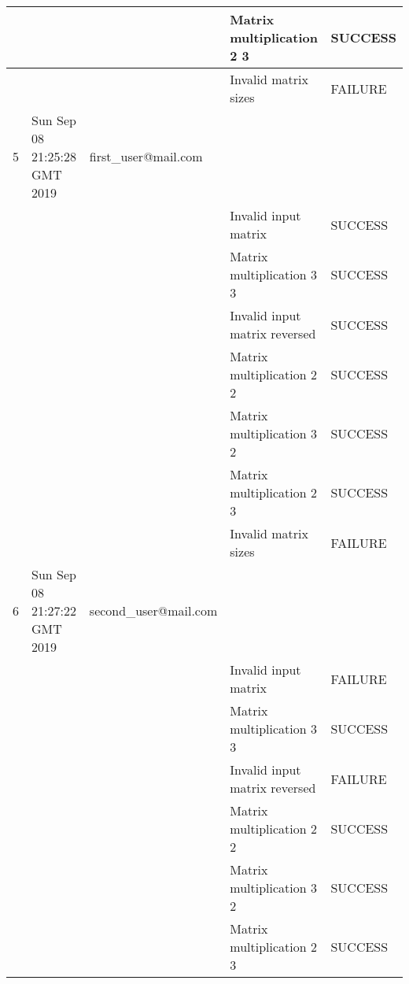 \begin{table}[H]
{\begin{tabular}{|l|l|l|l|l|}
    &                              &                                 & Matrix multiplication 2 3     & SUCCESS \\ \hline
    &                              &                                 & Invalid matrix sizes          & FAILURE \\ \hline
    5     & Sun Sep 08 21:25:28 GMT 2019 & first\_user@mail.com &                               &         \\ \hline
    &                              &                                 & Invalid input matrix          & SUCCESS \\ \hline
    &                              &                                 & Matrix multiplication 3 3     & SUCCESS \\ \hline
    &                              &                                 & Invalid input matrix reversed & SUCCESS \\ \hline
    &                              &                                 & Matrix multiplication 2 2     & SUCCESS \\ \hline
    &                              &                                 & Matrix multiplication 3 2     & SUCCESS \\ \hline
    &                              &                                 & Matrix multiplication 2 3     & SUCCESS \\ \hline
    &                              &                                 & Invalid matrix sizes          & FAILURE \\ \hline
    6     & Sun Sep 08 21:27:22 GMT 2019 & second\_user@mail.com               &                               &         \\ \hline
    &                              &                                 & Invalid input matrix          & FAILURE \\ \hline
    &                              &                                 & Matrix multiplication 3 3     & SUCCESS \\ \hline
    &                              &                                 & Invalid input matrix reversed & FAILURE \\ \hline
    &                              &                                 & Matrix multiplication 2 2     & SUCCESS \\ \hline
    &                              &                                 & Matrix multiplication 3 2     & SUCCESS \\ \hline
    &                              &                                 & Matrix multiplication 2 3     & SUCCESS \\ \hline

\end{tabular}}
\end{table}
